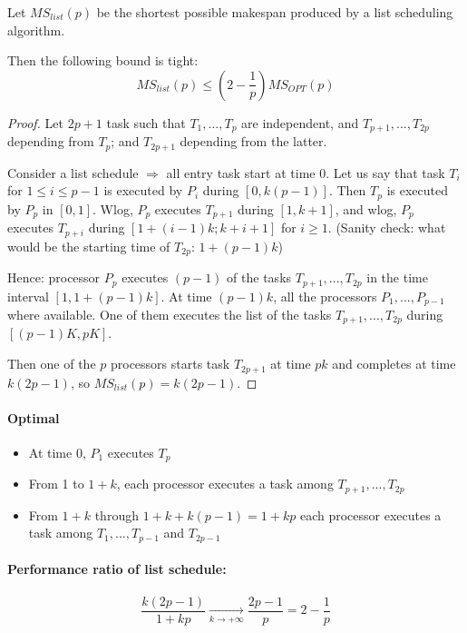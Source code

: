 \begin{prop}
Let $MS_{list}(p)$ be the shortest possible makespan produced by a list scheduling algorithm.

Then the following bound is tight:
\[MS_{list} (p) \leq \left( 2 - \frac{1}{p}\right) MS_{OPT}(p)\]
\end{prop}

\begin{proof}
Let $2p+1$ task such that $T_1,...,T_{p}$ are independent, and $T_{p+1},...,T_{2p}$ depending from $T_p$; and $T_{2p+1}$ depending from the latter.

Consider a list schedule $\Rightarrow$ all entry task start at time 0. Let us say that task $T_i$ for $1\leq i\leq p-1$ is executed by $P_i$ during $[0,k(p-1)]$. Then $T_p$ is executed by $P_p$ in $[0,1]$. Wlog, $P_p$ executes $T_{p+1}$ during $[1, k+1]$, and wlog, $P_p$ executes $T_{p+i}$ during $[1+(i-1)k;k+i+1]$ for $i\geq 1$. (Sanity check: what would be the starting time of $T_{2p}$: $1+(p-1)k$)

Hence: processor $P_p$ executes $(p-1)$ of the tasks $T_{p+1},...,T_{2p}$ in the time interval $[1,1+(p-1)k]$. At time $(p-1)k$, all the processors $P_1,...,P_{p-1}$ where available. One of them executes the list of the tasks $T_{p+1},...,T_{2p}$ during $[(p-1)K,pK]$.


Then one of the $p$ processors starts task $T_{2p+1}$ at time $pk$ and completes at time $k(2p-1)$, so $MS_{list}(p)=k(2p-1)$. 
\end{proof}

\paragraph{Optimal}
\begin{itemize}
\item At time 0, $P_1$ executes $T_p$
\item From 1 to $1+k$, each processor executes a task among $T_{p+1},...,T_{2p}$
\item From $1+k$ through $1+k+k(p-1)=1+kp$ each processor executes a task among $T_1,...,T_{p-1}$ and $T_{2p-1}$
\end{itemize}


\paragraph{Performance ratio of list schedule:}
\[\frac{k(2p-1)}{1+kp}\underset{k \to + \infty}{\longrightarrow} \frac{2p-1}{p}=2-\frac{1}{p}\]


